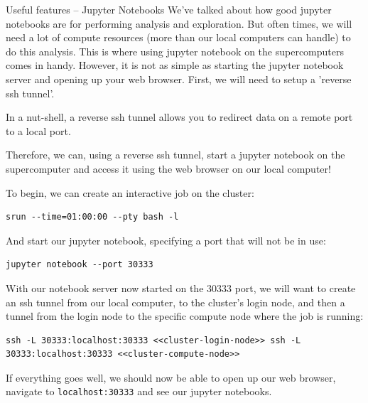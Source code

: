 \documentclass[10pt]{beamer}
\begin{document}
\begin{frame}[fragile,allowframebreaks,label=]{Useful features -- Jupyter Notebooks}
 We've talked about how good jupyter notebooks are for performing analysis and
exploration. But often times, we will need a lot of compute resources (more than our
local computers can handle) to do this analysis. This is where using jupyter notebook
on the supercomputers comes in handy. However, it is not as simple as starting the
jupyter notebook server and opening up your web browser. First, we will need to setup
a 'reverse ssh tunnel'.

In a nut-shell, a reverse ssh tunnel allows you to redirect data on a remote port to
a local port.

Therefore, we can, using a reverse ssh tunnel, start a jupyter notebook on the
supercomputer and access it using the web browser on our local computer!

To begin, we can create an interactive job on the cluster:

\begin{verbatim}
srun --time=01:00:00 --pty bash -l
\end{verbatim}

And start our jupyter notebook, specifying a port that will not be in use:

\begin{verbatim}
jupyter notebook --port 30333
\end{verbatim}

With our notebook server now started on the 30333 port, we will want to create an ssh
tunnel from our local computer, to the cluster's login node, and then a tunnel from
the login node to the specific compute node where the job is running:

\begin{verbatim}
ssh -L 30333:localhost:30333 <<cluster-login-node>> ssh -L 30333:localhost:30333 <<cluster-compute-node>>
\end{verbatim}

If everything goes well, we should now be able to open up our web browser, navigate
to \texttt{localhost:30333} and see our jupyter notebooks.
\end{frame}
\end{document}
